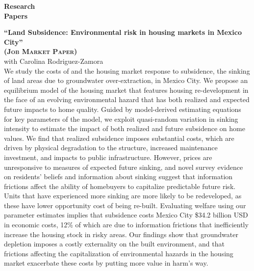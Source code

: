 \documentclass[10pt, oneside]{article}
\begin{document}
\begin{minipage}[t]{0.1\linewidth}
\textbf{Research \\ Papers}
\end{minipage}\hspace{0.05\linewidth}
\begin{minipage}[t]{0.8\linewidth}
\textbf{``Land Subsidence: Environmental risk in housing markets in Mexico City''\\ 
(\textsc{Job Market Paper})}\\ 
 with Carolina Rodriguez-Zamora \\

We study the costs of and the housing market response to subsidence, the sinking of land areas due to groundwater over-extraction, in Mexico City. 
We propose an equilibrium model of the housing market that features housing re-development in the face of an evolving environmental hazard that has both realized and expected future impacts to home quality. 
Guided by model-derived estimating equations for key parameters of the model, we  exploit quasi-random variation in sinking intensity to estimate the impact of both realized and future subsidence on home values. We find that realized subsidence imposes substantial costs, which are driven by physical degradation to the structure, increased maintenance investment, and impacts to public infrastructure. However, prices are unresponsive to measures of expected future sinking, and novel survey evidence on residents' beliefs and information about sinking suggest that information frictions affect the ability of homebuyers to capitalize predictable future risk. Units that have experienced more sinking are more likely to be redeveloped, as these have lower opportunity cost of being re-built. Evaluating welfare using our parameter estimates implies that subsidence costs Mexico City \$34.2 billion USD in economic costs, 12\% of which are due to information frictions that inefficiently increase the housing stock in risky areas. Our findings show that groundwater depletion imposes a costly externality on the built environment, and that frictions affecting the capitalization of environmental hazards in the housing market exacerbate these costs by putting more value in harm's way. \\


\end{minipage}
\end{document}

